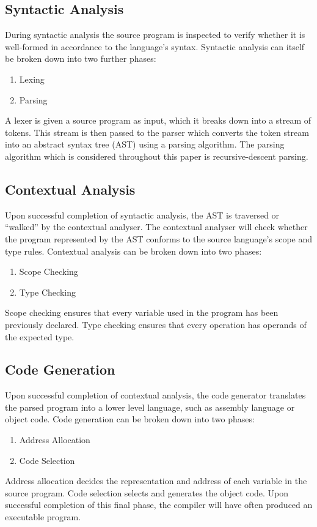 \documentclass{l4proj}
\begin{document}
\begin{appendices}
\subsection{Syntactic Analysis}
During syntactic analysis the source program is inspected to verify whether it is well-formed in accordance to the language's syntax. Syntactic analysis can itself be broken down into two further phases:
\begin{enumerate}
\item Lexing
\item Parsing
\end{enumerate}

A lexer is given a source program as input, which it breaks down into a stream of tokens. This stream is then passed to the parser which converts the token stream into an abstract syntax tree (AST) using a parsing algorithm. The parsing algorithm which is considered throughout this paper is recursive-descent parsing.

\subsection{Contextual Analysis}
Upon successful completion of syntactic analysis, the AST is traversed or ``walked'' by the contextual analyser. The contextual analyser will check whether the program represented by the AST conforms to the source language's scope and type rules. Contextual analysis can be broken down into two phases:
\begin{enumerate}
\item Scope Checking
\item Type Checking
\end{enumerate}

Scope checking ensures that every variable used in the program has been previously declared. Type checking ensures that every operation has operands of the expected type.

\subsection{Code Generation}
Upon successful completion of contextual analysis, the code generator translates the parsed program into a lower level language, such as assembly language or object code. Code generation can be broken down into two phases:
\begin{enumerate}
\item Address Allocation
\item Code Selection
\end{enumerate}

Address allocation decides the representation and address of each variable in the source program. Code selection selects and generates the object code. Upon successful completion of this final phase, the compiler will have often produced an executable program.
\end{appendices}



%
\end{document}
